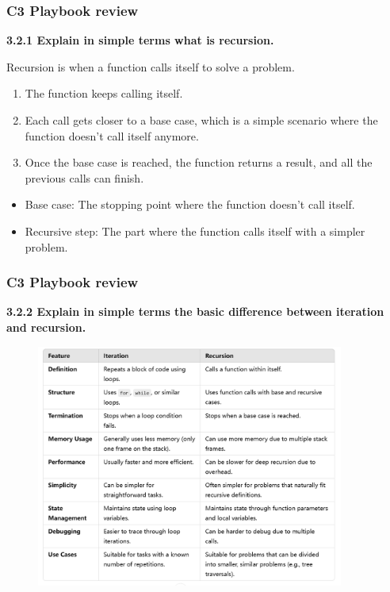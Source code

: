 \documentclass[
	11pt, %
]{beamer}
\begin{document}
\begin{frame}
	\frametitle{C3 Playbook review}
    \textbf{3.2.1 Explain in simple terms what is recursion.}
   
    Recursion is when a function calls itself to solve a problem.
    \begin{enumerate}
        \item The function keeps calling itself.
        \item Each call gets closer to a base case, which is a simple scenario where the function doesn't call itself anymore.
        \item Once the base case is reached, the function returns a result, and all the previous calls can finish.
    \end{enumerate}
    \begin{itemize}
        \item Base case: The stopping point where the function doesn't call itself.
        \item Recursive step: The part where the function calls itself with a simpler problem.
    \end{itemize}
\end{frame}

\begin{frame}
	\frametitle{C3 Playbook review}
    \textbf{3.2.2 Explain in simple terms the basic difference between iteration and recursion.}
    \begin{figure}
        \centering
        \includegraphics[width=0.9\textwidth]{iter_recur.png}
    \end{figure}
\end{frame}
\end{document}
